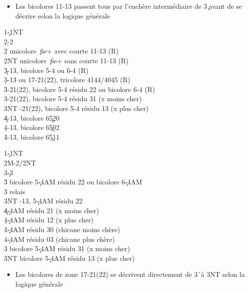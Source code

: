 \documentclass[a4paper]{article}
\begin{document}
\begin{itemize}
\item Les bicolores 11-13 passent tous par l'enchère intermédiaire de 3\c\ avant de se décrire selon la logique générale

\end{itemize}

\begin{bidtable}
1\c-1NT\\
2\d-2\h\\
2\s \> unicolore \c\ 6e+ avec courte 11-13 (R)\\
2NT \> unicolore \c\ 6e+ sans courte 11-13 (R)\\
3\c {}-13, bicolore 5-4 ou 6-4 (R)\\
3\d {}-13 ou 17-21(22), tricolore 4144/4045 (R)\\
3\h {}-21(22), bicolore 5-4 résidu 22 ou bicolore 6-4 (R)\\
3\s {}-21(22), bicolore 5-4 résidu 31 (x moins cher)\\
3NT -21(22), bicolore 5-4 résidu 13 (x plus cher)\\
4\c {}-13, bicolore 6\c 5\d 20\\
4\d {}-13, bicolore 6\c 5\d 02\\
4\h {}-13, bicolore 6\c 5\d 11
\end{bidtable}

\begin{bidtable}
1\c-1NT\\
2M-2\s/2NT\\
3\c-3\d\\
3\h \> bicolore 5\c -4AM résidu 22 ou bicolore 6\c -4AM\+\\
3\s \> relais\+\\
3NT -13, 5\c -4AM résidu 22\\
4\c {}\c -4AM résidu 21 (x moins cher)\\
4\d {}\c -4AM résidu 12 (x plus cher)\\
4\h {}\c -4AM résidu 30 (chicane moins chère)\\
4\s {}\c -4AM résidu 03 (chicane plus chère)\-\-\\
3\s \> bicolore 5\c -4AM résidu 31 (x moins cher)\\
3NT \> bicolore 5\c -4AM résidu 13 (x plus cher)
\end{bidtable}

\begin{itemize}
\item Les bicolores de zone 17-21(22) se décrivent directement de 3\h\ à 3NT selon la logique générale

\end{itemize}
\end{document}
